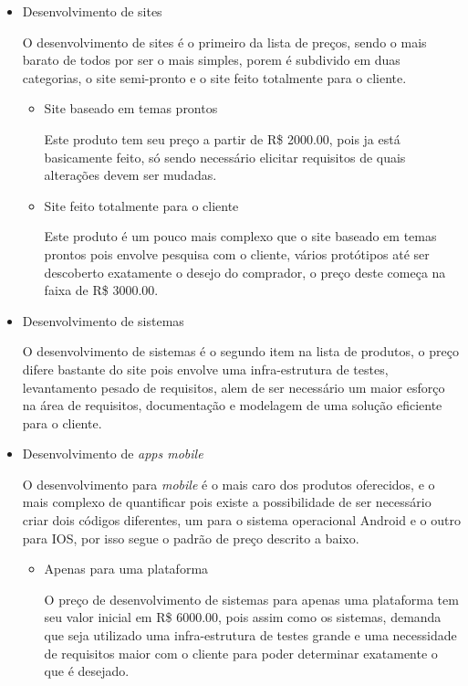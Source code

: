 		\begin{itemize}
			\item{Desenvolvimento de sites}

				O desenvolvimento de sites é o primeiro da lista de preços, sendo o mais barato de todos por ser o mais simples, porem é subdivido em duas categorias, o site semi-pronto e o site feito totalmente para o cliente.

				\begin{itemize}
					\item{Site baseado em temas prontos}

						Este produto tem seu preço a partir de R\$ 2000.00, pois ja está basicamente feito, só sendo necessário elicitar requisitos de quais alterações devem ser mudadas.

					\item{Site feito totalmente para o cliente}

						Este produto é um pouco mais complexo que o site baseado em temas prontos pois envolve pesquisa com o cliente, vários protótipos até ser descoberto exatamente o desejo do comprador, o preço deste começa na faixa de R\$ 3000.00.
				\end{itemize}

			\item{Desenvolvimento de sistemas}

				O desenvolvimento de sistemas é o segundo item na lista de produtos, o preço difere bastante do site pois envolve uma infra-estrutura de testes, levantamento pesado de requisitos, alem de ser necessário um maior esforço na área de requisitos, documentação e modelagem de uma solução eficiente para o cliente.

			\item{Desenvolvimento de \textit{apps mobile}}

				O desenvolvimento para \textit{mobile} é o mais caro dos produtos oferecidos, e o mais complexo de quantificar pois existe a possibilidade de ser necessário criar dois códigos diferentes, um para o sistema operacional Android e o outro para IOS, por isso segue o padrão de preço descrito a baixo.

				\begin{itemize}

					\item{Apenas para uma plataforma}

						O preço de desenvolvimento de sistemas para apenas uma plataforma tem seu valor inicial em R\$ 6000.00, pois assim como os sistemas, demanda que seja utilizado uma infra-estrutura de testes grande e uma necessidade de requisitos maior com o cliente para poder determinar exatamente o que é desejado. 


\end{itemize}
\end{itemize}
